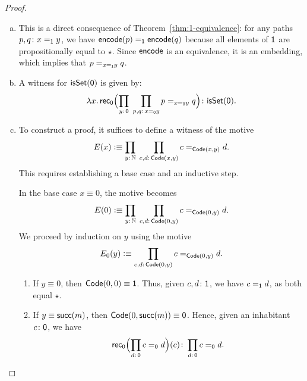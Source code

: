 \begin{proof}${}$
    \begin{enumerate}[a),font=\upshape]
        \item This is a direct consequence of Theorem~\ref{thm:1-equivalence}: for any paths $p,q\colon x\eq{\fun1}y$, we have $\mathsf{encode}(p)\mathrel{=_{\mathsf{1}}}\mathsf{encode}(q)$ because all elements of $\mathsf{1}$ are propositionally equal to $\star$. Since $\mathsf{encode}$ is an equivalence, it is an embedding, which implies that $p\mathrel{=_{x\mathrel{=_{\mathsf{1}}}y}}q$.

        \item A witness for $\mathsf{isSet}(\mathsf{0})$ is given by:
        \[
            \lambda x.\,
                \fun{rec}_{\fun0}
                    \Bigl(
                        \prod_{y\colon\fun0}\;
                        \prod_{p,q\colon x\eq{\fun0}y}
                            p\eq{x\eq{\fun0}y}q
                    \Bigr)\colon\fun{isSet}(\fun0).
        \]

        \item To construct a proof, it suffices to define a witness of the motive
        \[
            E(x)\defeq
                \prod_{y\colon\N}\;
                \prod_{c,d\colon\fun{Code}(x,y)}c\eq{\fun{Code}(x,y)}d.
        \]
        This requires establishing a base case and an inductive step.
        
        In the base case $x\equiv0$, the motive becomes
        \[
            E(0)\defeq
                \prod_{y\colon\N}\;\prod_{c,d\colon\fun{Code}(0,y)}
                    c\eq{\fun{Code}(0,y)}d.
        \]
        We proceed by induction on $y$ using the motive 
        \[
            E_0(y)\defeq\prod_{c,d\colon\fun{Code}(0,y)}c\eq{\fun{Code}(0,y)}d.
        \]
        
        \begin{enumerate}[-]
            \item If $y\equiv0$, then $\mathsf{Code}(0,0)\equiv\mathsf{1}$. Thus, given $c,d\colon\fun1$, we have $c\mathrel{=_{\mathsf{1}}}d$, as both equal $\star$.
            
            \item If $y\equiv\mathsf{succ}(m)$, then $\mathsf{Code}(0,\mathsf{succ}(m))\equiv\mathsf{0}$. Hence, given an inhabitant $c\colon\fun0$, we have
            \[
                \fun{rec}_{\fun0}
                    \Bigl(
                        \prod_{d\colon\fun0}c\eq{\fun0}d
                    \Bigr)(c)
                        \colon \prod_{d\colon\fun0}c\eq{\fun0}d.
            \]
        \end{enumerate}
        

\end{enumerate}
\end{proof}
